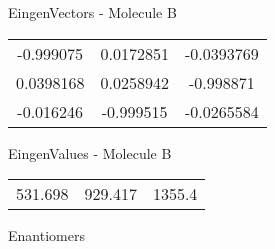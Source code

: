 \begin{multicols}{2}
\begin{center}
\vtab
 EingenVectors - Molecule B     \\
\vtab
\begin{tabular}{|c c c|}
-0.999075	 & 	0.0172851	 & 	-0.0393769	 \\
0.0398168	 & 	0.0258942	 & 	-0.998871	 \\
-0.016246	 & 	-0.999515	 & 	-0.0265584
\end{tabular}

\vtab
 EingenValues - Molecule B     \\
\vtab
\begin{tabular}{|c c c|}
531.698	 & 	929.417	 & 	1355.4	 \\
\end{tabular}

\end{center}
\end{multicols}
\begin{center}
\vtab
\vtab
\textcolor{NavyBlue}{\Large Enantiomers}
\end{center}

 \newpage

